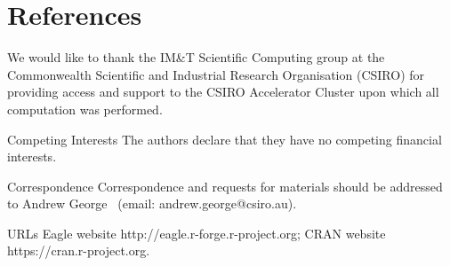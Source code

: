 \documentclass{nature}
\begin{document}
\section*{References}



\begin{addendum}
 \item We would like to thank the IM\&T Scientific Computing group at the Commonwealth Scientific and Industrial Research Organisation (CSIRO) for providing access and support to the CSIRO Accelerator Cluster upon which all computation was performed. 
\item[Competing Interests] The authors declare that they have no
competing financial interests.
 \item[Correspondence] Correspondence and requests for materials
should be addressed to Andrew George ~(email: andrew.george@csiro.au).
\item[URLs]  Eagle website http://eagle.r-forge.r-project.org;   
CRAN website https://cran.r-project.org. 

\end{addendum}
\end{document}
